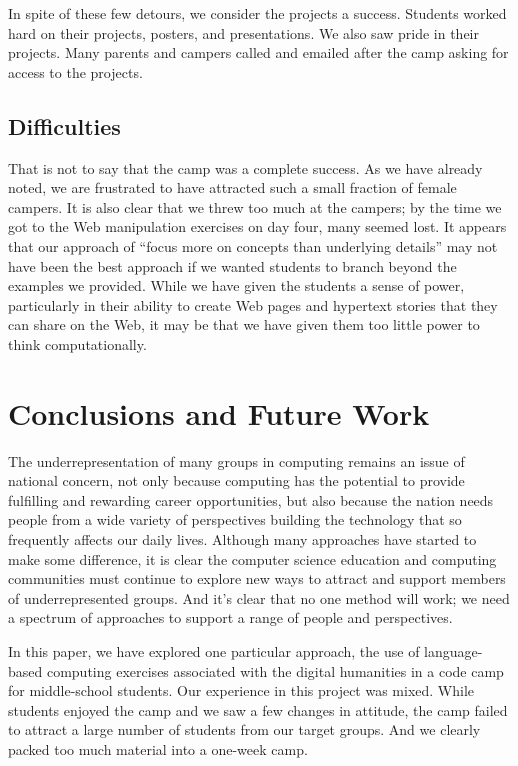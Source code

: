 In spite of these few detours, we consider the projects a success.
Students worked hard on their projects, posters, and presentations.
We also saw pride in their projects.  Many parents and campers
called and emailed after the camp asking for access to the projects.

\subsection{Difficulties}

That is not to say that the camp was a complete success.  As we
have already noted, we are frustrated to have attracted such a small
fraction of female campers.  It is also clear that we threw too
much at the campers; by the time we got to the Web manipulation
exercises on day four, many seemed lost.  It appears that our
approach of ``focus more on concepts than underlying details'' may
not have been the best approach if we wanted students to branch
beyond the examples we provided.  While we have given the students
a sense of power, particularly in their ability to create Web pages
and hypertext stories that they can share on the Web, it may be
that we have given them too little power to think computationally.

\section{Conclusions and Future Work}

The underrepresentation of many groups in computing remains an issue
of national concern, not only because computing has the potential
to provide fulfilling and rewarding career opportunities, but also
because the nation needs people from a wide variety of perspectives
building the technology that so frequently affects our daily lives.
Although many approaches have started to make some difference, it
is clear the computer science education and computing communities
must continue to explore new ways to attract and support members
of underrepresented groups.  And it's clear that no one method will
work; we need a spectrum of approaches to support a range of
people and perspectives.

In this paper, we have explored one particular approach, the use
of language-based computing exercises associated with the digital
humanities in a code camp for middle-school students.  Our experience
in this project was mixed.  While students enjoyed the camp
and we saw a few changes in attitude, the camp failed to attract a
large number of students from our target groups.  And we clearly
packed too much material into a one-week camp.

